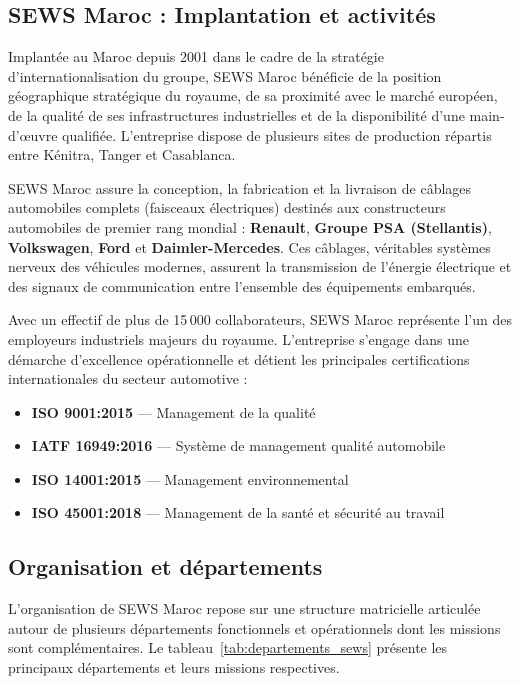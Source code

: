 \subsection{SEWS Maroc : Implantation et activités}

Implantée au Maroc depuis 2001 dans le cadre de la stratégie d'internationalisation du groupe, SEWS Maroc bénéficie de la position géographique stratégique du royaume, de sa proximité avec le marché européen, de la qualité de ses infrastructures industrielles et de la disponibilité d'une main-d'œuvre qualifiée. L'entreprise dispose de plusieurs sites de production répartis entre Kénitra, Tanger et Casablanca.

SEWS Maroc assure la conception, la fabrication et la livraison de câblages automobiles complets (faisceaux électriques) destinés aux constructeurs automobiles de premier rang mondial : \textbf{Renault}, \textbf{Groupe PSA (Stellantis)}, \textbf{Volkswagen}, \textbf{Ford} et \textbf{Daimler-Mercedes}. Ces câblages, véritables systèmes nerveux des véhicules modernes, assurent la transmission de l'énergie électrique et des signaux de communication entre l'ensemble des équipements embarqués.

Avec un effectif de plus de 15\,000 collaborateurs, SEWS Maroc représente l'un des employeurs industriels majeurs du royaume. L'entreprise s'engage dans une démarche d'excellence opérationnelle et détient les principales certifications internationales du secteur automotive :

\begin{itemize}
    \item \textbf{ISO 9001:2015} --- Management de la qualité
    \item \textbf{IATF 16949:2016} --- Système de management qualité automobile\cite{iatf16949}
    \item \textbf{ISO 14001:2015} --- Management environnemental
    \item \textbf{ISO 45001:2018} --- Management de la santé et sécurité au travail
\end{itemize}

\subsection{Organisation et départements}

L'organisation de SEWS Maroc repose sur une structure matricielle articulée autour de plusieurs départements fonctionnels et opérationnels dont les missions sont complémentaires. Le tableau~\ref{tab:departements_sews} présente les principaux départements et leurs missions respectives.

